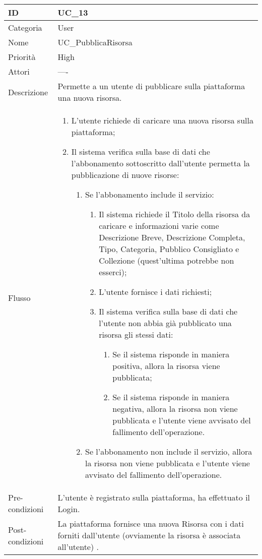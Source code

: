 \begin{center}
\begin{tabular}{ |p{2cm}|p{13cm}|  }
\hline
ID & UC\_13 \\\hline
Categoria & User\\\hline
Nome & UC\_PubblicaRisorsa\\\hline
Priorità & High \\\hline
Attori &  ---- \\\hline
Descrizione & Permette a un utente di pubblicare sulla piattaforma una nuova risorsa.\\\hline
Flusso &  	\begin{enumerate}
			\item L'utente richiede di caricare una nuova risorsa sulla piattaforma;
			\item Il sistema verifica sulla base di dati che l'abbonamento sottoscritto dall'utente permetta la pubblicazione di nuove risorse:
			\begin{enumerate}
				\item Se l'abbonamento include il servizio:
				\begin{enumerate}
					\item Il sistema richiede il Titolo della risorsa da caricare e informazioni varie come Descrizione Breve,  Descrizione Completa, Tipo, Categoria, Pubblico Consigliato e Collezione (quest'ultima potrebbe non esserci);
					\item L'utente fornisce i dati richiesti;
					\item Il sistema verifica sulla base di dati che l'utente non abbia già pubblicato una risorsa gli stessi dati:
					\begin{enumerate}
						\item Se il sistema risponde in maniera positiva, allora la risorsa viene pubblicata;
						\item Se il sistema risponde in maniera negativa, allora  la risorsa non viene pubblicata e l'utente viene avvisato del fallimento dell'operazione.
					\end{enumerate}
				\end{enumerate}
				\item Se l'abbonamento non include il servizio, allora la risorsa non viene pubblicata e l'utente viene avvisato del fallimento dell'operazione.
			\end{enumerate}
		\end{enumerate}\\\hline
Pre-condizioni & L'utente è registrato sulla piattaforma, ha effettuato il Login.\\\hline
Post-condizioni & La piattaforma fornisce una nuova Risorsa con i dati forniti dall'utente (ovviamente la risorsa è associata all'utente) .\\\hline
\end{tabular}
\label{table_use_case:13} \newline


\end{center}
